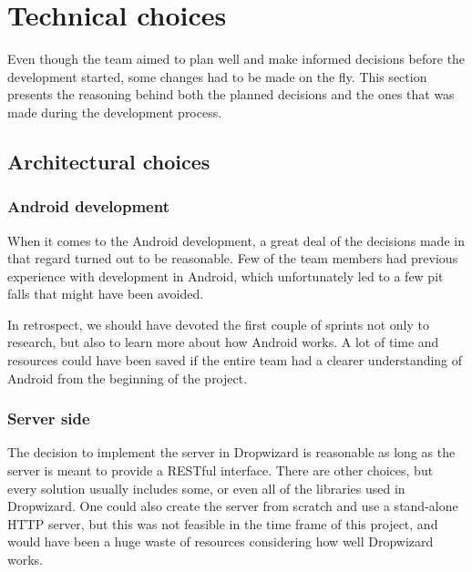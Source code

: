 \section{Technical choices}
Even though the team aimed to plan well and make informed decisions before the development started, some changes had to be made on the fly. This section presents the reasoning behind both the planned decisions and the ones that was made during the development process.

\subsection{Architectural choices}
\subsubsection{Android development}
When it comes to the Android development, a great deal of the decisions made in that regard turned out to be reasonable. Few of the team members had previous experience with development in Android, which unfortunately led to a few pit falls that might have been avoided.

In retrospect, we should have devoted the first couple of sprints not only to research, but also to learn more about how Android works. A lot of time and resources could have been saved if the entire team had a clearer understanding of Android from the beginning of the project.

\subsubsection{Server side}

The decision to implement the server in Dropwizard is reasonable as long as the server is meant to provide a RESTful interface. There are other choices, but every solution usually includes some, or even all of the libraries used in Dropwizard. One could also create the server from scratch and use a stand-alone HTTP server, but this was not feasible in the time frame of this project, and would have been a huge waste of resources considering how well Dropwizard works.

